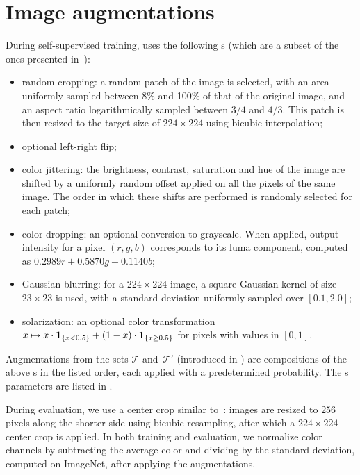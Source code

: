 \section{Image augmentations}
\label{app:transf}
During self-supervised training, \algo uses the following \imageaugmentation s (which are a subset of the ones presented in~\cite{SimCLR}):
\begin{itemize}
    \item random cropping: a random patch of the image is selected, with an area uniformly sampled between 8\% and 100\% of that of the original image, and an aspect ratio logarithmically sampled between $3/4$ and $4/3$. This patch is then resized to the target size of $224 \times 224$ using bicubic interpolation;
    \item optional left-right flip;
    \item color jittering: the brightness, contrast, saturation and hue of the image are shifted by a uniformly random offset applied on all the pixels of the same image. The order in which these shifts are performed is randomly selected for each patch;
    \item color dropping: an optional conversion to grayscale. When applied, output intensity for a pixel $(r, g, b)$ corresponds to its luma component, computed as $0.2989 r + 0.5870 g + 0.1140 b$;
    \item Gaussian blurring: for a $224 \times 224$ image, a square Gaussian kernel of size $23 \times 23$ is used, with a standard deviation uniformly sampled over $[0.1, 2.0]$;
    \item solarization: an optional color transformation $x \mapsto x \cdot {\bf 1}_{\{x < 0.5\}} + (1 - x) \cdot {\bf 1}_{\{x \ge 0.5\}}$ for pixels with values in $[0, 1]$.
\end{itemize}

Augmentations from the sets $\mathcal{T}$ and~$\mathcal{T}'$ (introduced in ) are compositions of the above \imageaugmentation s in the listed order, each applied with a predetermined probability. The \imageaugmentation s parameters are listed in .

During evaluation, we use a center crop similar to~\cite{SimCLR}: images are resized to $256$ pixels along the shorter side using bicubic resampling, after which a $224 \times 224$ center crop is applied. In both training and evaluation, we normalize color channels by subtracting the average color and dividing by the standard deviation, computed on ImageNet, after applying the augmentations.

